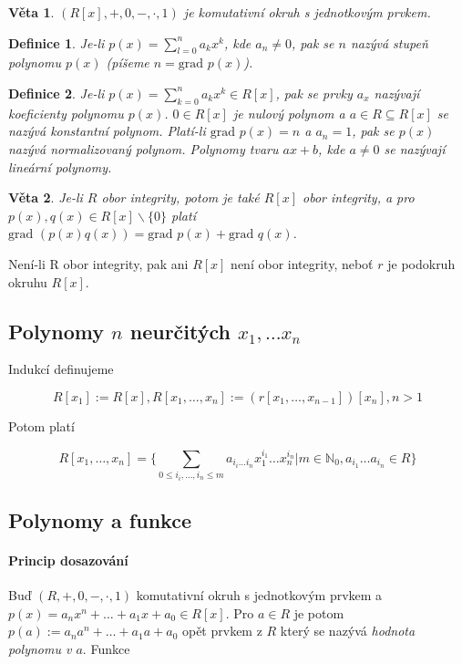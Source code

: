\documentclass[a4paper, 11pt]{report}
\newtheorem{mydef}{Definice}[chapter]
\newtheorem{veta}{Věta}[chapter]
\begin{document}
\begin{veta}
$(R[x], +, 0, -, \cdot, 1)$ je komutativní okruh s jednotkovým prvkem.
\end{veta}

\begin{mydef}
Je-li $p(x) = \sum_{l = 0}^n a_k x^k$, kde $a_n \not= 0$, pak se $n$ nazývá stupeň polynomu $p(x)$ (píšeme $n = \text{grad } p(x)$). 
\end{mydef}

\begin{mydef}
Je-li $p(x) = \sum_{k = 0}^n a_k x^k \in R[x]$, pak se prvky $a_x$ nazývají koeficienty polynomu $p(x)$. $0 \in R[x]$ je nulový polynom a $a \in R \subseteq R[x]$ se nazývá konstantní polynom. Platí-li $\text{grad } p(x) = n$ a $a_n = 1$, pak se $p(x)$ nazývá normalizovaný polynom. Polynomy tvaru $ax + b$, kde $a \not= 0$ se nazývají lineární polynomy.
\end{mydef}

\begin{veta}
Je-li $R$ obor integrity, potom je také $R[x]$ obor integrity, a pro $p(x), q(x) \in R[x] \backslash \{0\}$ platí $\text{grad } (p(x)q(x)) = \text{grad } p(x) + \text{grad } q(x)$.
\end{veta}

Není-li R obor integrity, pak ani $R[x]$ není obor integrity, neboť $r$ je podokruh  okruhu $R[x]$.

\subsection{Polynomy $n$ neurčitých $x_1, \dots x_n$}

Indukcí definujeme

$$R[x_1] := R[x], R[x_1, \dots, x_n] := (r[x_1, \dots, x_{n-1}])[x_n], n > 1$$

Potom platí

$$ R[x_1, \dots, x_n] = \{ \sum\limits_{0 \leq i_i, \dots, i_n \leq m} a_{i_i \dots i_n} x_1^{i_1} \dots x_n^{i_n} | m \in \mathbb{N}_0, a_{i_1} \dots a_{i_n} \in R \} $$

\subsection{Polynomy a funkce}
\paragraph{Princip dosazování} Buď $(R, +, 0, -, \cdot, 1)$ komutativní okruh s jednotkovým prvkem a $p(x) = a_n x^n + \dots + a_1 x + a_0 \in R[x]$. Pro $a \in R$ je potom $p(a) := a_n a^n + \dots + a_1 a + a_0$ opět prvkem z $R$ který se nazývá \emph{hodnota polynomu v $a$}. Funkce
\end{document}
